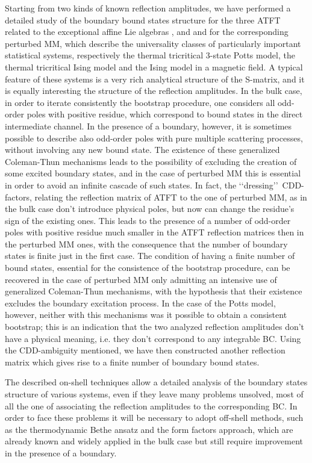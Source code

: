 \documentclass[a4paper,12pt]{report}
\begin{document}
Starting from two kinds of known reflection amplitudes, we have performed a detailed study of the boundary bound
states structure for the three ATFT related to the exceptional affine Lie algebras \coordHE{}, \coordHE{} and \coordHE{}
and for the corresponding perturbed MM, which describe the universality classes of particularly important
statistical systems, respectively the thermal tricritical 3-state Potts model, the thermal tricritical Ising
model and the Ising model in a magnetic field. A typical feature of these systems is a very rich analytical
structure of the S-matrix, and it is equally interesting the structure of the reflection amplitudes. In the bulk
case, in order to iterate consistently the bootstrap procedure, one considers all odd-order poles with positive
residue, which correspond to bound states in the direct intermediate channel. In the presence of a boundary,
however, it is sometimes possible to describe also odd-order poles with pure multiple scattering processes,
without involving any new bound state. The existence of these generalized Coleman-Thun mechanisms leads to the
possibility of excluding the creation of some excited boundary states, and in the case of perturbed MM this is
essential in order to avoid an infinite cascade of such states. In fact, the \lq\lq dressing\rq\rq \,
CDD-factors, relating the reflection matrix of ATFT to the one of perturbed MM, as in the bulk case don't
introduce physical poles, but now can change the residue's sign of the existing ones. This leads to the presence
of a number of odd-order poles with positive residue much smaller in the ATFT reflection matrices then in the
perturbed MM ones, with the consequence that the number of boundary states is finite just in the first case. The
condition of having a finite number of bound states, essential for the consistence of the bootstrap procedure,
can be recovered in the case of perturbed MM only admitting an intensive use of generalized Coleman-Thun
mechanisms, with the hypothesis that their existence excludes the boundary excitation process. In the case of the
Potts model, however, neither with this mechanisms was it possible to obtain a consistent bootstrap; this is an
indication that the two analyzed reflection amplitudes don't have a physical meaning, i.e. they don't correspond
to any integrable BC. Using the CDD-ambiguity mentioned, we have then constructed another reflection matrix which
gives rise to a finite number of boundary bound states.

The described on-shell techniques allow a detailed analysis of the boundary states structure of various systems,
even if they leave many problems unsolved, most of all the one of associating the reflection amplitudes to the
corresponding BC. In order to face these problems it will be necessary to adopt off-shell methods, such as the
thermodynamic Bethe ansatz and the form factors approach, which are already known and widely applied in the bulk
case but still require improvement in the presence of a boundary.
\end{document}
